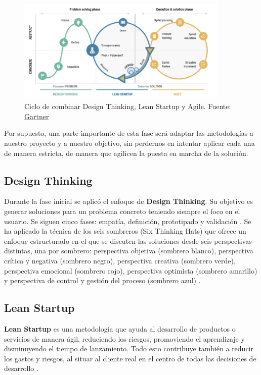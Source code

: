 \begin{figure}[H]
\centering
\includegraphics[width=0.9\textwidth]{./img/methodologies/methodologies.png}
\caption{Ciclo de combinar Design Thinking, Lean Startup y Agile.  Fuente: \href{https://www.gartner.com/en}{Gartner}}
\label{fig:methodologies}
\end{figure}

Por supuesto, una parte importante de esta fase será adaptar las metodologías a nuestro proyecto y a nuestro objetivo, sin perdernos en intentar aplicar cada una de manera estricta, de manera que agilicen la puesta en marcha de la solución.

\subsection{Design Thinking}

Durante la fase inicial se aplicó el enfoque de \textbf{Design Thinking}. Su objetivo es generar soluciones para un problema concreto teniendo siempre el foco en el usuario. Se siguen cinco fases: empatía, definición, prototipado y validación \cite{designthinking}. Se ha aplicado la técnica de los seis sombreros (Six Thinking Hats) que ofrece un enfoque estructurado en el que se discuten las soluciones desde seis perspectivas distintas, una por sombrero: perspectiva objetiva (sombrero blanco), perspectiva crítica y negativa (sombrero negro), perspectiva creativa (sombrero verde), perspectiva emocional (sombrero rojo), perspectiva optimista (sombrero amarillo) y perspectiva de control y gestión del proceso (sombrero azul) \cite{six-thinking-hats}.

\subsection{Lean Startup}

\textbf{Lean Startup} es una metodología que ayuda al desarrollo de productos o servicios de manera ágil, reduciendo los riesgos, promoviendo el aprendizaje y disminuyendo el tiempo de lanzamiento. Todo esto contribuye también a reducir los gastos y riesgos, al situar al cliente real en el centro de todas las decisiones de desarrollo \cite{leanstartup}.

